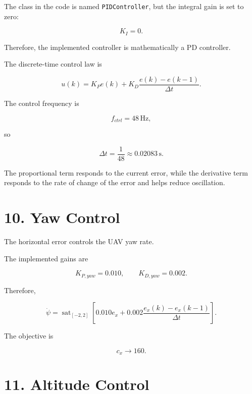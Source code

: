 \documentclass[12pt,a4paper]{article}
\begin{document}
The class in the code is named \texttt{PIDController}, but the integral gain is set to zero:

\begin{equation}
K_I=0.
\end{equation}

Therefore, the implemented controller is mathematically a PD controller.

The discrete-time control law is

\begin{equation}
\boxed{
u(k)=K_Pe(k)+
K_D\frac{e(k)-e(k-1)}{\Delta t}.
}
\end{equation}

The control frequency is

\begin{equation}
f_{ctrl}=48\,\mathrm{Hz},
\end{equation}

so

\begin{equation}
\boxed{
\Delta t=\frac{1}{48}\approx0.02083\,\mathrm{s}.
}
\end{equation}

The proportional term responds to the current error, while the derivative term responds to the rate of change of the error and helps reduce oscillation.

\section{10. Yaw Control}

The horizontal error controls the UAV yaw rate.

The implemented gains are

\begin{equation}
K_{P,yaw}=0.010,\qquad
K_{D,yaw}=0.002.
\end{equation}

Therefore,

\begin{equation}
\boxed{
\dot{\psi}
=
\operatorname{sat}_{[-2,2]}
\left[
0.010e_x+
0.002
\frac{e_x(k)-e_x(k-1)}
{\Delta t}
\right].
}
\end{equation}

The objective is

\begin{equation}
c_x\rightarrow160.
\end{equation}

\section{11. Altitude Control}
\end{document}
